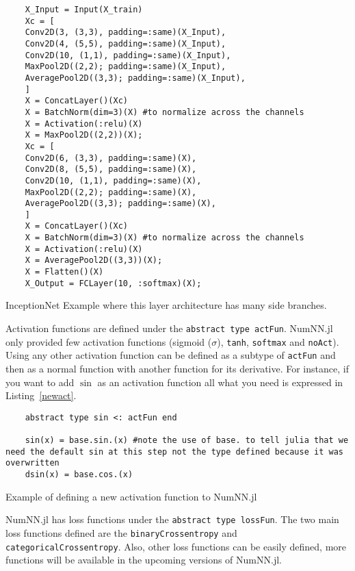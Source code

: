 \begin{listing}[!h]
	\begin{verbatim}
	X_Input = Input(X_train)
	Xc = [
	Conv2D(3, (3,3), padding=:same)(X_Input),
	Conv2D(4, (5,5), padding=:same)(X_Input),
	Conv2D(10, (1,1), padding=:same)(X_Input),
	MaxPool2D((2,2); padding=:same)(X_Input),
	AveragePool2D((3,3); padding=:same)(X_Input),
	]
	X = ConcatLayer()(Xc)
	X = BatchNorm(dim=3)(X) #to normalize across the channels
	X = Activation(:relu)(X)
	X = MaxPool2D((2,2))(X);
	Xc = [
	Conv2D(6, (3,3), padding=:same)(X),
	Conv2D(8, (5,5), padding=:same)(X),
	Conv2D(10, (1,1), padding=:same)(X),
	MaxPool2D((2,2); padding=:same)(X),
	AveragePool2D((3,3); padding=:same)(X),
	]
	X = ConcatLayer()(Xc)
	X = BatchNorm(dim=3)(X) #to normalize across the channels
	X = Activation(:relu)(X)
	X = AveragePool2D((3,3))(X);
	X = Flatten()(X)
	X_Output = FCLayer(10, :softmax)(X);
	\end{verbatim}
	\caption{InceptionNet Example where this layer architecture has many side branches.}\label{chain}
\end{listing}

Activation functions are defined under the \texttt{abstract type actFun}. NumNN.jl only provided few activation functions (sigmoid ($\sigma$), \texttt{tanh}, \texttt{softmax} and \texttt{noAct}). Using any other activation function can be defined as a subtype of \texttt{actFun} and then as a normal function with another function for its derivative. For instance, if you want to add $\sin$ as an activation function all what you need is expressed in Listing~\ref{newact}.

\begin{listing}[!ht]
	\begin{verbatim}
	abstract type sin <: actFun end
	
	sin(x) = base.sin.(x) #note the use of base. to tell julia that we need the default sin at this step not the type defined because it was overwritten
	dsin(x) = base.cos.(x)
	\end{verbatim}
	\caption{Example of defining a new activation function to NumNN.jl}\label{newact}
\end{listing}

NumNN.jl has loss functions under the \texttt{abstract type lossFun}. The two main loss functions defined are the \texttt{binaryCrossentropy} and \texttt{categoricalCrossentropy}. Also, other loss functions can be easily defined, more functions will be available in the upcoming versions of NumNN.jl.

